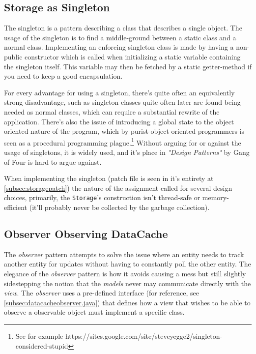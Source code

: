 \documentclass[a4paper]{scrreprt}
\begin{document}
\subsection{Storage as Singleton}
\label{subsec:Singleton}

The singleton is a pattern describing a class that describes a single object. The usage of the singleton is to find a middle-ground between a static class and a normal class. Implementing an enforcing singleton class is made by having a non-public constructor which is called when initializing a static variable containing the singleton itself. This variable may then be fetched by a static getter-method if you need to keep a good encapsulation.

For every advantage for using a singleton, there's quite often an equivalently strong disadvantage, such as singleton-classes quite often later are found being needed as normal classes, which can require a substantial rewrite of the application. There's also the issue of introducing a global state to the object oriented nature of the program, which by purist object oriented programmers is seen as a procedural programming plague.\footnote{See for example https://sites.google.com/site/steveyegge2/singleton-considered-stupid} Without arguing for or against the usage of singletons, it is widely used, and it's place in \textit{"Design Patterns"} by Gang of Four is hard to argue against.

When implementing the singleton (patch file is seen in it's entirety at \ref{subsec:storagepatch}) the nature of the assignment called for several design choices, primarily, the \texttt{Storage}'s construction isn't thread-safe or memory-efficient (it'll probably never be collected by the garbage collection).

\subsection{Observer Observing DataCache}
\label{subsec:Observer}

The \textit{observer} pattern attempts to solve the issue where an entity needs to track another entity for updates without having to constantly poll the other entity. The elegance of the \textit{observer} pattern is how it avoids causing a mess but still slightly sidestepping the notion that the \textit{models} never may communicate directly with the \textit{view}. The \textit{observer} uses a pre-defined interface (for reference, see \ref{subsec:datacacheobserver.java}) that defines how a view that wishes to be able to observe a observable object must implement a specific class.
\end{document}
